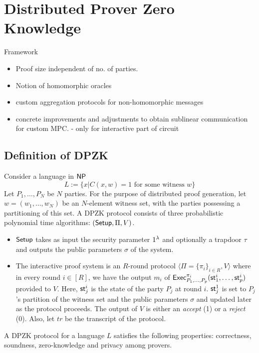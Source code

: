 \section{Distributed Prover Zero Knowledge}
Framework
\begin{itemize}
\item Proof size independent of no. of parties.
\item Notion of homomorphic oracles
\item custom aggregation protocols for non-homomorphic messages
\item concrete improvements and adjustments to obtain sublinear communication for custom MPC. - only for interactive part of circuit
\end{itemize}

\subsection{Definition of DPZK}
Consider a language in $\mathsf{NP}$
\[
L := \{ x | C(x, w) =1 \text{ for some witness } w \}
\]
Let $P_1, \ldots, P_N$ be $N$ parties. For the purpose of distributed proof generation, let $w = (w_1, \ldots, w_N)$ be an $N$-element witness set, with the parties possessing a partitioning of this set. A DPZK protocol consists of three probabilistic polynomial time algorithms: $(\mathsf{Setup}, \Pi, V)$. 
\begin{itemize}
\item $\mathsf{Setup}$ takes as input the security parameter $1^{\lambda}$ and optionally a trapdoor $\tau$ and outputs the public parameters $\sigma$ of the system.
\item The interactive proof system is an $R$-round protocol $\langle \Pi = \{\pi_i\}_{i \in R}, V \rangle$ where in every round $i \in [R]$, we have the output $m_i$ of $\mathsf{Exec}^{\pi_i}_{P_1, \ldots, P_p}(\mathsf{st}^i_1, \ldots, \mathsf{st}^i_p)$ provided to $V$. Here, $\mathsf{st}^i_j$ is the state of the party $P_j$ at round $i$. $\mathsf{st}^1_j$ is set to $P_j$'s partition of the witness set and the public parameters $\sigma$ and updated later as the protocol proceeds. The output of $V$ is either an \textit{accept} (1) or a \textit{reject} (0). Also, let $tr$ be the transcript of the protocol.
\end{itemize}
A DPZK protocol for a language $L$
satisfies the following properties: 
correctness, soundness, zero-knowledge and privacy among provers.
